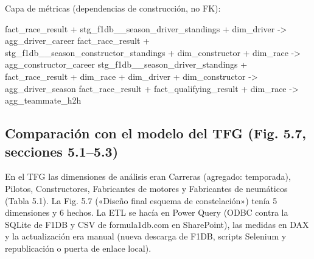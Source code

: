 Capa de métricas (dependencias de construcción, no FK):

\begin{diagramatexto}
fact_race_result + stg_f1db__season_driver_standings + dim_driver -> agg_driver_career
fact_race_result + stg_f1db__season_constructor_standings + dim_constructor + dim_race -> agg_constructor_career
stg_f1db__season_driver_standings + fact_race_result + dim_race + dim_driver + dim_constructor -> agg_driver_season
fact_race_result + fact_qualifying_result + dim_race -> agg_teammate_h2h
\end{diagramatexto}

\subsection{Comparación con el modelo del TFG (Fig. 5.7, secciones 5.1–5.3)}

En el TFG las dimensiones de análisis eran Carreras (agregado: temporada), Pilotos, Constructores, Fabricantes de motores y Fabricantes de neumáticos (Tabla 5.1). La Fig. 5.7 («Diseño final esquema de constelación») tenía 5 dimensiones y 6 hechos. La ETL se hacía en Power Query (ODBC contra la SQLite de F1DB y CSV de formula1db.com en SharePoint), las medidas en DAX y la actualización era manual (nueva descarga de F1DB, scripts Selenium y republicación o puerta de enlace local).

